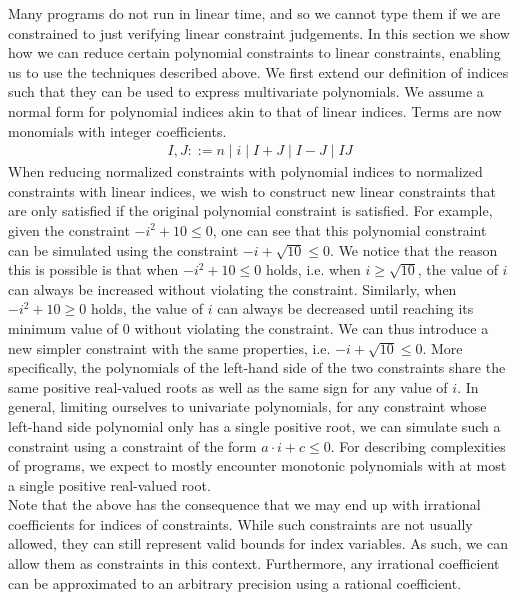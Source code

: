 Many programs do not run in linear time, and so we cannot type them if we are constrained to just verifying linear constraint judgements. In this section we show how we can reduce certain polynomial constraints to linear constraints, enabling us to use the techniques described above. We first extend our definition of indices such that they can be used to express multivariate polynomials. We assume a normal form for polynomial indices akin to that of linear indices. Terms are now monomials with integer coefficients.
%
\begin{align*}
        I,J ::= n \mid i \mid I + J \mid I - J \mid I J
\end{align*}
%
When reducing normalized constraints with polynomial indices to normalized constraints with linear indices, we wish to construct new linear constraints that are only satisfied if the original polynomial constraint is satisfied. For example, given the constraint ${-i^2 + 10 \leq 0}$, one can see that this polynomial constraint can be simulated using the constraint $-i + \sqrt{10} \leq 0$. We notice that the reason this is possible is that when ${-i^2 + 10 \leq 0}$ holds, i.e. when $i \geq \sqrt{10}$, the value of $i$ can always be increased without violating the constraint. Similarly, when ${-i^2 + 10 \geq 0}$ holds, the value of $i$ can always be decreased until reaching its minimum value of 0 without violating the constraint. We can thus introduce a new simpler constraint with the same properties, i.e. $-i + \sqrt{10} \leq 0$. More specifically, the polynomials of the left-hand side of the two constraints share the same positive real-valued roots as well as the same sign for any value of $i$. In general, limiting ourselves to univariate polynomials, for any constraint whose left-hand side polynomial only has a single positive root, we can simulate such a constraint using a constraint of the form $a \cdot i + c \leq 0$. For describing complexities of programs, we expect to mostly encounter monotonic polynomials with at most a single positive real-valued root.\\

Note that the above has the consequence that we may end up with irrational coefficients for indices of constraints. While such constraints are not usually allowed, they can still represent valid bounds for index variables. As such, we can allow them as constraints in this context. Furthermore, any irrational coefficient can be approximated to an arbitrary precision using a rational coefficient.\\

